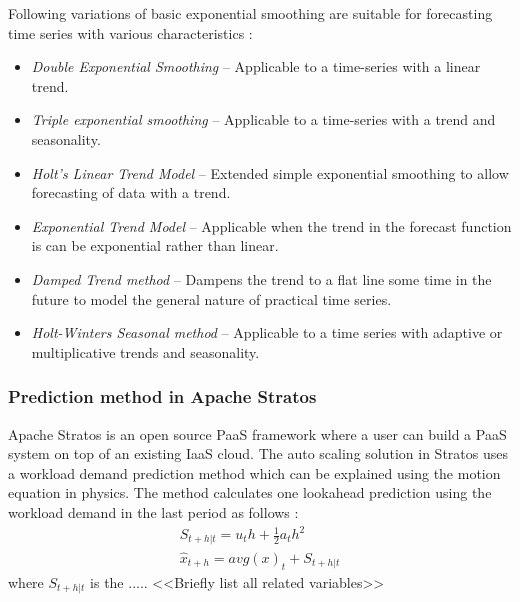 Following variations of basic exponential smoothing are suitable for forecasting time series with various characteristics \cite{AHyndman 2013}:

\begin{itemize}
\item \textit{Double Exponential Smoothing} -- Applicable to a time-series with a linear trend.
\item \textit{Triple exponential smoothing} -- Applicable to a time-series with a trend and seasonality.
\item \textit{Holt's Linear Trend Model} -- Extended simple exponential smoothing to allow forecasting of data with a trend.
\item \textit{Exponential Trend Model} -- Applicable when the trend in the forecast function is can be exponential rather than linear.
\item \textit{Damped Trend method} -- Dampens the trend to a flat line some time in the future to model the general nature of practical time series.
\item \textit{Holt-Winters Seasonal method} -- Applicable to a time series with adaptive or multiplicative trends and seasonality.
\end{itemize}


\subsubsection{Prediction method in Apache Stratos}
Apache Stratos is an open source PaaS framework where a user can build a PaaS system on top of an existing IaaS cloud. The auto scaling solution in Stratos uses a workload demand prediction method which can be explained using the motion equation in physics. The method calculates one lookahead prediction using the workload demand in the last period as follows \cite{StratosModel}:
\begin{eqnarray}
S_{t+h|t} = u_{t}h+ \frac{1}{2} a_{t}h^2 \\
\hat{x}_{t+h}=avg(x)_{t} + S_{t+h|t} 
\end{eqnarray}
where $S_{t+h|t}$ is the ..... <<Briefly list all related variables>>

